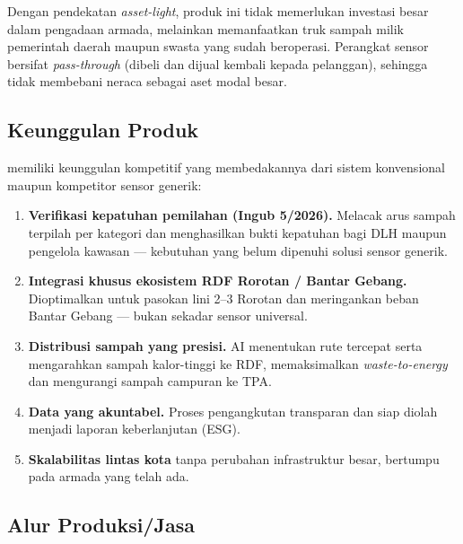 Dengan pendekatan \textit{asset-light}, produk ini tidak memerlukan investasi besar dalam pengadaan armada, melainkan memanfaatkan truk sampah milik pemerintah daerah maupun swasta yang sudah beroperasi. Perangkat sensor bersifat \textit{pass-through} (dibeli dan dijual kembali kepada pelanggan), sehingga tidak membebani neraca sebagai aset modal besar.

\subsection{Keunggulan Produk}
\label{sec:2-2}

\ProductName{} memiliki keunggulan kompetitif yang membedakannya dari sistem konvensional maupun kompetitor sensor generik:
\begin{enumerate}[leftmargin=1.5cm]
  \item \textbf{Verifikasi kepatuhan pemilahan (Ingub 5/2026).} Melacak arus sampah terpilah per kategori dan menghasilkan bukti kepatuhan bagi DLH maupun pengelola kawasan --- kebutuhan yang belum dipenuhi solusi sensor generik.
  \item \textbf{Integrasi khusus ekosistem RDF Rorotan / Bantar Gebang.} Dioptimalkan untuk pasokan lini 2--3 Rorotan dan meringankan beban Bantar Gebang --- bukan sekadar sensor universal.
  \item \textbf{Distribusi sampah yang presisi.} AI menentukan rute tercepat serta mengarahkan sampah kalor-tinggi ke RDF, memaksimalkan \textit{waste-to-energy} dan mengurangi sampah campuran ke TPA.
  \item \textbf{Data yang akuntabel.} Proses pengangkutan transparan dan siap diolah menjadi laporan keberlanjutan (ESG).
  \item \textbf{Skalabilitas lintas kota} tanpa perubahan infrastruktur besar, bertumpu pada armada yang telah ada.
\end{enumerate}

\subsection{Alur Produksi/Jasa}
\label{sec:2-3}

